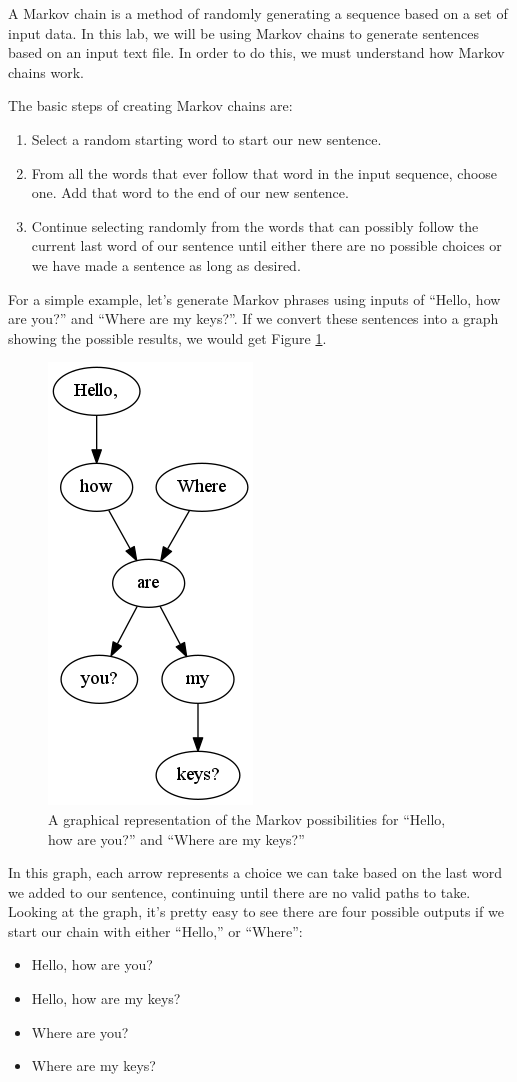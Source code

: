 \documentclass[11pt]{cselabheader}
\begin{document}
A Markov chain is a method of randomly generating a sequence based on a set of
input data. In this lab, we will be using Markov chains to generate sentences
based on an input text file. In order to do this, we must understand how Markov
chains work.

The basic steps of creating Markov chains are:
\begin{enumerate}
  \item Select a random starting word to start our new sentence.
  \item From all the words that ever follow that word in the input sequence,
    choose one. Add that word to the end of our new sentence.
  \item Continue selecting randomly from the words that can possibly follow the
    current last word of our sentence until either there are no possible choices
    or we have made a sentence as long as desired.
\end{enumerate}

For a simple example, let's generate Markov phrases using inputs of ``Hello, how
are you?'' and ``Where are my keys?''. If we convert these sentences into a
graph showing the possible results, we would get Figure \ref{mark_ex}.

\begin{figure}[h]
  \centering
  \includegraphics[width=0.2\linewidth]{lab9/example}
  \caption{A graphical representation of the Markov possibilities for ``Hello,
    how are you?'' and ``Where are my keys?''}
  \label{mark_ex}
\end{figure}

In this graph, each arrow represents a choice we can take based on the last word
we added to our sentence, continuing until there are no valid paths to take.
Looking at the graph, it's pretty easy to see there are four possible outputs if
we start our chain with either ``Hello,'' or ``Where'':

\begin{itemize}
  \item Hello, how are you?
  \item Hello, how are my keys?
  \item Where are you?
  \item Where are my keys?
\end{itemize}
\end{document}
